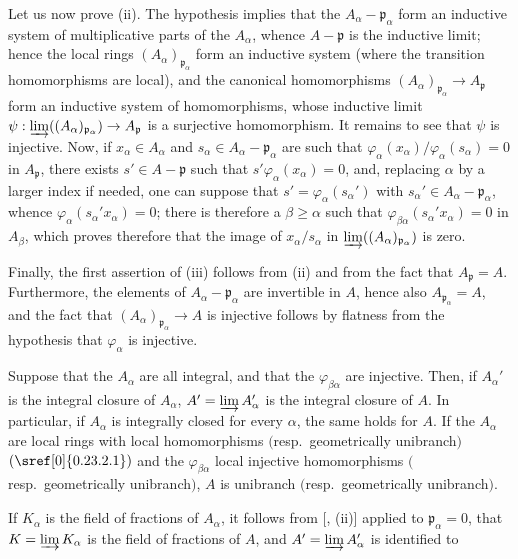 Let us now prove (ii).
The hypothesis implies that the $A_\alpha-\mathfrak{p}_\alpha$ form an inductive system of multiplicative parts of the $A_\alpha$, whence $A-\mathfrak{p}$ is the inductive limit; hence the local rings $(A_\alpha)_{\mathfrak{p}_\alpha}$ form an inductive system (where the transition homomorphisms are local), and the canonical homomorphisms $(A_\alpha)_{\mathfrak{p}_\alpha}\to A_\mathfrak{p}$ form an inductive system of homomorphisms, whose inductive limit $\psi:\varinjlim((A_\alpha)_{\mathfrak{p}_\alpha})\to A_\mathfrak{p}$ is a surjective homomorphism.
It remains to see that $\psi$ is injective.
Now, if $x_\alpha\in A_\alpha$ and $s_\alpha\in A_\alpha-\mathfrak{p}_\alpha$ are such that $\varphi_\alpha(x_\alpha)/\varphi_\alpha(s_\alpha)=0$ in $A_\mathfrak{p}$, there exists $s'\in A-\mathfrak{p}$ such that $s'\varphi_\alpha(x_\alpha)=0$, and, replacing $\alpha$ by a larger index if needed, one can suppose that $s'=\varphi_\alpha(s_\alpha')$ with $s_\alpha'\in A_\alpha-\mathfrak{p}_\alpha$, whence $\varphi_\alpha(s_\alpha'x_\alpha)=0$; there is therefore a $\beta\geqslant\alpha$ such that $\varphi_{\beta\alpha}(s_\alpha'x_\alpha)=0$ in $A_\beta$, which proves therefore that the image of $x_\alpha/s_\alpha$ in $\varinjlim((A_\alpha)_{\mathfrak{p}_\alpha})$ is zero.

Finally, the first assertion of (iii) follows from (ii) and from the fact that $A_\mathfrak{p}=A$.
Furthermore, the elements of $A_\alpha-\mathfrak{p}_\alpha$ are invertible in $A$, hence also $A_{\mathfrak{p}_\alpha}=A$, and the fact that $(A_\alpha)_{\mathfrak{p}_\alpha}\to A$ is injective follows by flatness from the hypothesis that $\varphi_\alpha$ is injective.

\begin{corollary}[5.13.4]
\label{IV.5.13.4}
Suppose that the $A_\alpha$ are all integral, and that the $\varphi_{\beta\alpha}$ are injective.
Then, if $A_\alpha'$ is the integral closure of $A_\alpha$, $A'=\varinjlim A_\alpha'$ is the integral closure of $A$.
In particular, if $A_\alpha$ is integrally closed for every $\alpha$, the same holds for $A$.
If the $A_\alpha$ are local rings with local homomorphisms $($resp.\ geometrically unibranch$)$ $(\sref[0]{0.23.2.1})$ and the $\varphi_{\beta\alpha}$ local injective homomorphisms $($resp.\ geometrically unibranch$)$, $A$ is unibranch $($resp.\ geometrically unibranch$)$.
\end{corollary}

If $K_\alpha$ is the field of fractions of $A_\alpha$, it follows from [, (ii)] applied to $\mathfrak{p}_\alpha=0$, that $K=\varinjlim K_\alpha$ is the field of fractions of $A$, and $A'=\varinjlim A_\alpha'$ is identified to

